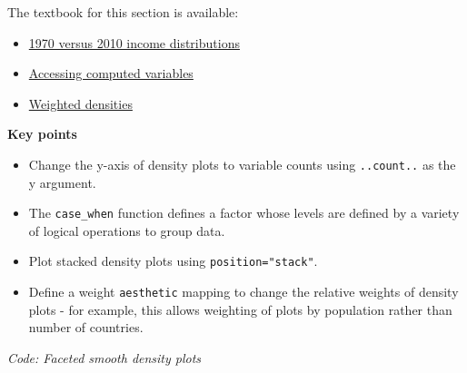 \documentclass[
]{article}
\newenvironment{Shaded}{\begin{snugshade}}{\end{snugshade}}
\newcommand{\CommentTok}[1]{\textcolor[rgb]{0.56,0.35,0.01}{\textit{#1}}}
\newcommand{\DataTypeTok}[1]{\textcolor[rgb]{0.13,0.29,0.53}{#1}}
\newcommand{\KeywordTok}[1]{\textcolor[rgb]{0.13,0.29,0.53}{\textbf{#1}}}
\newcommand{\NormalTok}[1]{#1}
\newcommand{\OperatorTok}[1]{\textcolor[rgb]{0.81,0.36,0.00}{\textbf{#1}}}
\newcommand{\StringTok}[1]{\textcolor[rgb]{0.31,0.60,0.02}{#1}}
\providecommand{\tightlist}{%
  \setlength{\itemsep}{0pt}\setlength{\parskip}{0pt}}
\begin{document}
The textbook for this section is available:

\begin{itemize}
\tightlist
\item
  \href{https://rafalab.github.io/dsbook/gapminder.html\#example-1970-versus-2010-income-distributions}{1970
  versus 2010 income distributions}
\item
  \href{https://rafalab.github.io/dsbook/gapminder.html\#accessing-computed-variables}{Accessing
  computed variables}
\item
  \href{https://rafalab.github.io/dsbook/gapminder.html\#weighted-densities}{Weighted
  densities}
\end{itemize}

\textbf{Key points}

\begin{itemize}
\tightlist
\item
  Change the y-axis of density plots to variable counts using
  \texttt{..count..} as the y argument.
\item
  The \texttt{case\_when} function defines a factor whose levels are
  defined by a variety of logical operations to group data.
\item
  Plot stacked density plots using \texttt{position="stack"}.
\item
  Define a weight \texttt{aesthetic} mapping to change the relative
  weights of density plots - for example, this allows weighting of plots
  by population rather than number of countries.
\end{itemize}

\emph{Code: Faceted smooth density plots}

\begin{Shaded}
\end{Shaded}
\end{document}
